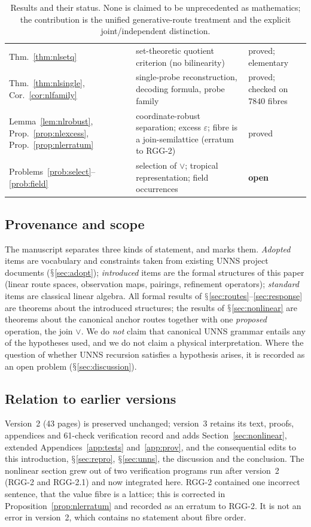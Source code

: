 \documentclass[11pt,a4paper]{article}
\renewcommand{\S}{\ensuremath{\mathsection}}
\newcommand{\vj}{\mathbin{\vee}}
\theoremstyle{plain}
\theoremstyle{definition}
\begin{document}
\begin{table}[t]
\begin{tabularx}{\textwidth}{@{}l>{\raggedright\arraybackslash}X>{\raggedright\arraybackslash}p{}@{}}
Thm.~\ref{thm:nlsetq} & set-theoretic quotient criterion (no bilinearity) & proved; elementary\\
Thm.~\ref{thm:nlsingle}, Cor.~\ref{cor:nlfamily} & single-probe reconstruction, decoding formula, probe family & proved; checked on $7840$ fibres\\
Lemma~\ref{lem:nlrobust}, Prop.~\ref{prop:nlexcess}, Prop.~\ref{prop:nlerratum} & coordinate-robust separation; excess $\varepsilon$; fibre is a join-semilattice (erratum to RGG-2) & proved\\
Problems~\ref{prob:select}--\ref{prob:field} & selection of $\vj$; tropical representation; field occurrences & \textbf{open}\\
\bottomrule
\end{tabularx}
\caption{Results and their status. None is claimed to be unprecedented as mathematics; the contribution is the unified generative-route treatment and the explicit joint/independent distinction.}\label{tab:results}
\end{table}

\subsection{Provenance and scope}
The manuscript separates three kinds of statement, and marks them.
\emph{Adopted} items are vocabulary and constraints taken from existing UNNS project documents (\S\ref{sec:adopt}); \emph{introduced} items are the formal structures of this paper (linear route spaces, observation maps, pairings, refinement operators); \emph{standard} items are classical linear algebra.
All formal results of \S\ref{sec:routes}--\ref{sec:response} are theorems about the introduced structures; the results of \S\ref{sec:nonlinear} are theorems about the canonical anchor routes together with one \emph{proposed} operation, the join $\vj$.
We do \emph{not} claim that canonical UNNS grammar entails any of the hypotheses used, and we do not claim a physical interpretation.
Where the question of whether UNNS recursion satisfies a hypothesis arises, it is recorded as an open problem (\S\ref{sec:discussion}).

\subsection{Relation to earlier versions}
Version~2 (43 pages) is preserved unchanged; version~3 retains its text, proofs, appendices and 61-check verification record and adds Section~\ref{sec:nonlinear}, extended Appendices~\ref{app:tests} and~\ref{app:prov}, and the consequential edits to this introduction, \S\ref{sec:repro}, \S\ref{sec:unns}, the discussion and the conclusion.
The nonlinear section grew out of two verification programs run after version~2 (RGG-2 and RGG-2.1) and now integrated here.
RGG-2 contained one incorrect sentence, that the value fibre is a lattice; this is corrected in Proposition~\ref{prop:nlerratum} and recorded as an erratum to RGG-2.
It is not an error in version~2, which contains no statement about fibre order.
\end{document}
